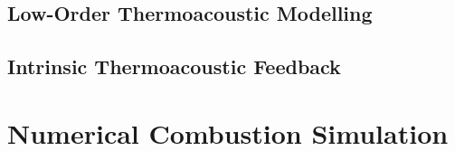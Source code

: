 \subsection{Low-Order Thermoacoustic Modelling}



\subsection{Intrinsic Thermoacoustic Feedback}





\section{Numerical Combustion Simulation}

\cite{orszag1970AnalyticalTheoriesTurbulence, domingo2023RecentDevelopmentsDNS, chen2011PetascaleDirectNumerical, yang2015LargeeddySimulationPresent, veynante2002TurbulentCombustionModeling, moin1998DirectNumericalSimulation, tennekes1972FirstCourseTurbulence}




